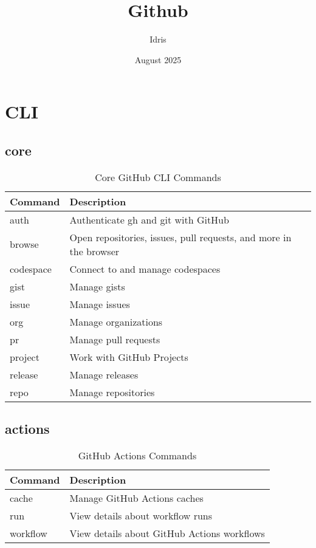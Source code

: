 \documentclass[openany, 12pt]{book}
\title{Github}
\author{Idris}
\date{August 2025}
\begin{document}
\tableofcontents

\part{CLI}

\chapter{core}
\begin{table}[h]
	\centering
	\begin{tabular}{ll}
		\toprule
		\textbf{Command} & \textbf{Description}                                              \\
		\midrule
		auth             & Authenticate gh and git with GitHub                               \\
		browse           & Open repositories, issues, pull requests, and more in the browser \\
		codespace        & Connect to and manage codespaces                                  \\
		gist             & Manage gists                                                      \\
		issue            & Manage issues                                                     \\
		org              & Manage organizations                                              \\
		pr               & Manage pull requests                                              \\
		project          & Work with GitHub Projects                                         \\
		release          & Manage releases                                                   \\
		repo             & Manage repositories                                               \\
		\bottomrule
	\end{tabular}
	\caption{Core GitHub CLI Commands}
\end{table}

\chapter{actions}
\begin{table}[h]
	\centering
	\begin{tabular}{ll}
		\toprule
		\textbf{Command} & \textbf{Description}                        \\
		\midrule
		cache            & Manage GitHub Actions caches                \\
		run              & View details about workflow runs            \\
		workflow         & View details about GitHub Actions workflows \\
		\bottomrule
	\end{tabular}
	\caption{GitHub Actions Commands}
\end{table}
\end{document}
